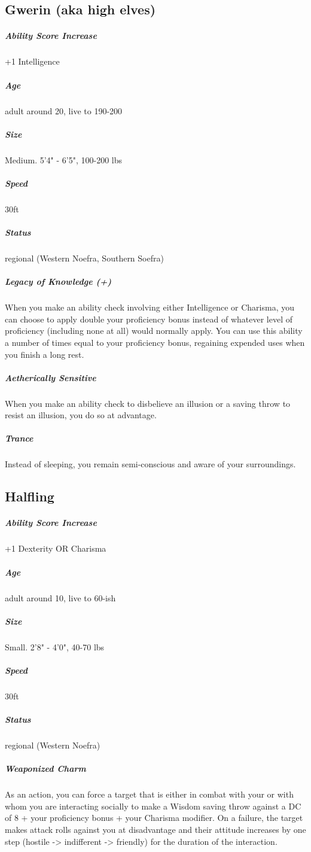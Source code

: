 \subsection{Gwerin (aka high elves)} \label{lineage:gwerin}

\subparagraph*{Ability Score Increase}  +1 Intelligence

\subparagraph*{Age}  adult around 20, live to 190-200

\subparagraph*{Size}  Medium. 5'4" - 6'5", 100-200 lbs

\subparagraph*{Speed}  30ft

\subparagraph*{Status}  regional (Western Noefra, Southern Soefra)

\subparagraph*{Legacy of Knowledge (+)}  When you make an ability check involving either Intelligence or Charisma, you can choose to apply double your proficiency bonus instead of whatever level of proficiency (including none at all) would normally apply. You can use this ability a number of times equal to your proficiency bonus, regaining expended uses when you finish a long rest.

\subparagraph*{Aetherically Sensitive}  When you make an ability check to disbelieve an illusion or a saving throw to resist an illusion, you do so at advantage.

\subparagraph*{Trance}  Instead of sleeping, you remain semi-conscious and aware of your surroundings.

\subsection{Halfling}\label{lineage:halfling}

\subparagraph*{Ability Score Increase}  +1 Dexterity OR Charisma

\subparagraph*{Age}  adult around 10, live to 60-ish

\subparagraph*{Size}  Small. 2'8" - 4'0", 40-70 lbs

\subparagraph*{Speed}  30ft

\subparagraph*{Status}  regional (Western Noefra)

\subparagraph*{Weaponized Charm}  As an action, you can force a target that is either in combat with your or with whom you are interacting socially to make a Wisdom saving throw against a DC of 8 + your proficiency bonus + your Charisma modifier. On a failure, the target makes attack rolls against you at disadvantage and their attitude increases by one step (hostile -> indifferent -> friendly) for the duration of the interaction. 

